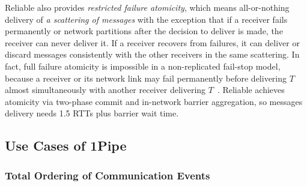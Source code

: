 Reliable \sys{} also provides \emph{restricted failure atomicity}, which means all-or-nothing delivery of \emph{a scattering of messages} with the exception that if a receiver fails permanently or network partitions after the decision to deliver is made, the receiver can never deliver it.
If a receiver recovers from failures, it can deliver or discard messages consistently with the other receivers in the same scattering.
In fact, full failure atomicity is impossible in a non-replicated fail-stop model, because a receiver or its network link may fail permanently before delivering $T$ almost simultaneously with another receiver delivering $T$~\cite{fischer1985impossibility}.
Reliable \sys{} achieves atomicity via two-phase commit and in-network barrier aggregation, so messages delivery needs 1.5 RTTs plus barrier wait time.

\subsection{Use Cases of 1Pipe}
\label{subsec:application}

\subsubsection{Total Ordering of Communication Events}
\label{subsec:order-hazards}

